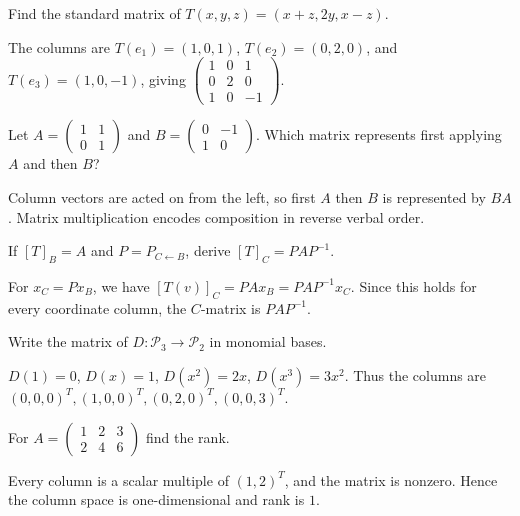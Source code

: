 \begin{problem}\label{prob:i07-problem-01}
Find the standard matrix of $T(x,y,z)=(x+z,2y,x-z)$.
\end{problem}
\begin{solution}
The columns are $T(e_1)=(1,0,1)$, $T(e_2)=(0,2,0)$, and $T(e_3)=(1,0,-1)$, giving $\begin{pmatrix}1&0&1\\0&2&0\\1&0&-1\end{pmatrix}$.
\end{solution}

\begin{problem}\label{prob:i07-problem-02}
Let $A=\begin{pmatrix}1&1\\0&1\end{pmatrix}$ and $B=\begin{pmatrix}0&-1\\1&0\end{pmatrix}$. Which matrix represents first applying $A$ and then $B$?
\end{problem}
\begin{solution}
Column vectors are acted on from the left, so first $A$ then $B$ is represented by $BA$. Matrix multiplication encodes composition in reverse verbal order.
\end{solution}

\begin{problem}\label{prob:i07-problem-03}
If $[T]_B=A$ and $P=P_{C\leftarrow B}$, derive $[T]_C=PAP^{-1}$.
\end{problem}
\begin{solution}
For $x_C=Px_B$, we have $[T(v)]_C=P A x_B=PAP^{-1}x_C$. Since this holds for every coordinate column, the $C$-matrix is $PAP^{-1}$.
\end{solution}

\begin{problem}\label{prob:i07-problem-04}
Write the matrix of $D:\mathcal P_3\to\mathcal P_2$ in monomial bases.
\end{problem}
\begin{solution}
$D(1)=0$, $D(x)=1$, $D(x^2)=2x$, $D(x^3)=3x^2$. Thus the columns are $(0,0,0)^T,(1,0,0)^T,(0,2,0)^T,(0,0,3)^T$.
\end{solution}

\begin{problem}\label{prob:i07-problem-05}
For $A=\begin{pmatrix}1&2&3\\2&4&6\end{pmatrix}$ find the rank.
\end{problem}
\begin{solution}
Every column is a scalar multiple of $(1,2)^T$, and the matrix is nonzero. Hence the column space is one-dimensional and rank is $1$.
\end{solution}


